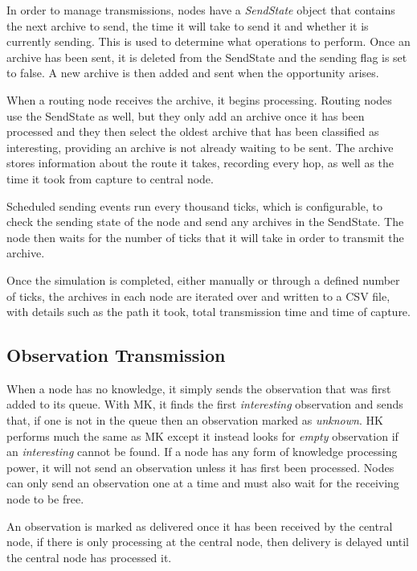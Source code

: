 	In order to manage transmissions, nodes have a \textit{SendState} object that contains the next archive to send, the time it will take to send it and whether it is currently sending. This is used to determine what operations to perform. Once an archive has been sent, it is deleted from the SendState and the sending flag is set to false. A new archive is then added and sent when the opportunity arises.
	
	When a routing node receives the archive, it begins processing. Routing nodes use the SendState as well, but they only add an archive once it has been processed and they then select the oldest archive that has been classified as interesting, providing an archive is not already waiting to be sent. The archive stores information about the route it takes, recording every hop, as well as the time it took from capture to central node.
	
	Scheduled sending events run every thousand ticks, which is configurable, to check the sending state of the node and send any archives in the SendState. The node then waits for the number of ticks that it will take in order to transmit the archive.
	
	Once the simulation is completed, either manually or through a defined number of ticks, the archives in each node are iterated over and written to a CSV file, with details such as the path it took, total transmission time and time of capture.

\subsection{Observation Transmission}
When a node has no knowledge, it simply sends the observation that was first added to its queue. With MK, it finds the first \textit{interesting} observation and sends that, if one is not in the queue then an observation marked as \textit{unknown}.  HK performs much the same as MK except it instead looks for \textit{empty} observation if an \textit{interesting} cannot be found. If a node has any form of knowledge processing power, it will not send an observation unless it has first been processed. Nodes can only send an observation one at a time and must also wait for the receiving node to be free.

An observation is marked as delivered once it has been received by the central node, if there is only processing at the central node, then delivery is delayed until the central node has processed it.



